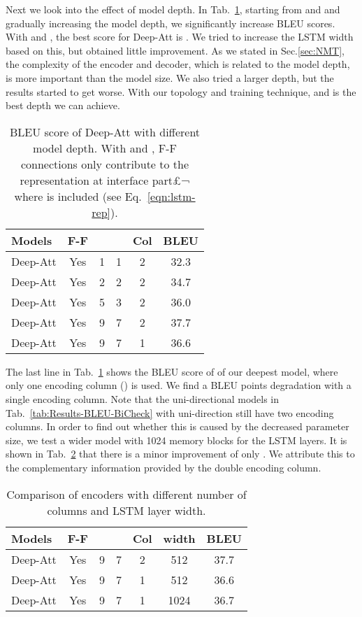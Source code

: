 \documentclass[11pt,letterpaper]{article}
\begin{document}
Next we look into the effect of model depth. In Tab.~\ref{tab:Results-BLEU-SingleDepthCheck}, starting from  and  and gradually
increasing the model depth, we significantly increase BLEU scores. With  and , the best score for Deep-Att is . We tried
to increase the LSTM width based on this, but obtained little improvement. As we stated in Sec.\ref{sec:NMT}, the complexity of the encoder
and decoder, which is related to the model depth, is more important than the model size. We also tried a larger depth, but the results started
to get worse. With our topology and training technique,  and  is the best depth we can achieve.
\begin{table}[!ht]
\footnotesize
\begin{center}
\begin{tabular}{|l|c|c|c|c|c|}
\hline
  Models & F-F & &  & Col & BLEU \\
  \hline
  Deep-Att  & Yes & 1  & 1 & 2 & 32.3 \\
  Deep-Att  & Yes & 2  & 2 & 2 & 34.7 \\
  Deep-Att  & Yes & 5  & 3 & 2 & 36.0 \\
  Deep-Att  & Yes & 9 &  7 & 2 & 37.7 \\
  Deep-Att  & Yes & 9  & 7 & 1 & 36.6 \\
  \hline
\end{tabular}
\end{center}
\caption{\label{tab:Results-BLEU-SingleDepthCheck} BLEU score of Deep-Att with different model depth. With  and , F-F
connections only contribute to the representation at interface part£¬ where  is included (see Eq.~\ref{eqn:lstm-rep}).}
\end{table}


The last line in Tab.~\ref{tab:Results-BLEU-SingleDepthCheck} shows the BLEU \mbox{score} of  of our deepest model, where only one
encoding column () is used. We find a  BLEU points degradation with a single encoding column. Note that the
uni-directional models in Tab.~\ref{tab:Results-BLEU-BiCheck}  with uni-direction still have two encoding columns.  In order to find out
whether this is caused by the decreased parameter size, we test a wider model with 1024 memory blocks for the LSTM layers. It is shown in
Tab.~\ref{tab:Results-BLEU-SingleColCheck} that there is a minor improvement of only . We attribute this to the complementary information
provided by the double encoding column.
\begin{table}[!ht]
\footnotesize
\begin{center}
\begin{tabular}{|l|c|c|c|c|c|c|}
\hline
  Models & F-F & &  & Col & width &BLEU \\
  \hline
  Deep-Att  & Yes & 9 &  7 & 2 & 512 & 37.7 \\
  Deep-Att  & Yes & 9  & 7 & 1 & 512 & 36.6 \\
  Deep-Att  & Yes & 9  & 7 & 1 & 1024 & 36.7 \\
  \hline
\end{tabular}
\end{center}
\caption{\label{tab:Results-BLEU-SingleColCheck} Comparison of encoders with different number of columns and LSTM layer width.}
\end{table}
\end{document}
